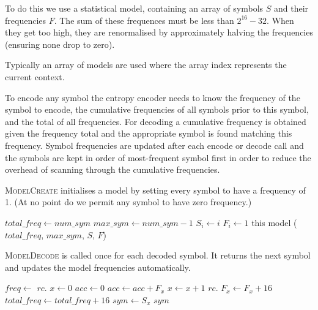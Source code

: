 \documentclass[a4paper]{article}
\begin{document}
To do this we use a statistical model, containing an array of symbols $S$ and their frequencies $F$.
The sum of these frequences must be less than $2^{16}-32$.
When they get too high, they are renormalised by approximately halving the frequencies (ensuring none drop to zero).

Typically an array of models are used where the array index represents the current context.

To encode any symbol the entropy encoder needs to know the frequency of the symbol to encode, the cumulative frequencies of all symbols prior to this symbol, and the total of all frequencies.
For decoding a cumulative frequency is obtained given the frequency total and the appropriate symbol is found matching this frequency.
Symbol frequencies are updated after each encode or decode call and the symbols are kept in order of most-frequent symbol first in order to  reduce the overhead of scanning through the cumulative frequencies.

\textsc{ModelCreate} initialises a model by setting every symbol to have a frequency of 1.
(At no point do we permit any symbol to have zero frequency.)

\begin{algorithmic}[1]
  \State $total\_freq \gets num\_sym$
  \State $max\_sym \gets num\_sym-1$
    \State $S_i \gets i$
    \State $F_i \gets 1$
  \EndFor
  \State \Return this model ($total\_freq$, $max\_sym$, $S$, $F$)
\EndFunction
\end{algorithmic}

\textsc{ModelDecode} is called once for each decoded symbol.
It returns the next symbol and updates the model frequencies automatically.

\begin{algorithmic}[1]
  \State $freq \gets$ $rc.$
  \State $x \gets 0$
  \State $acc \gets 0$
    \State $acc \gets acc + F_x$
    \State $x \gets x+1$
  \EndWhile
  \State $rc.$
  \State $F_x \gets F_x + 16$ 
  \State $total\_freq \gets total\_freq + 16$
    \State {}
  \EndIf
  \State $sym \gets S_x$
    \State {}
    \State {}
  \EndIf
  \State \Return $sym$
\EndFunction
\end{algorithmic}
\end{document}
